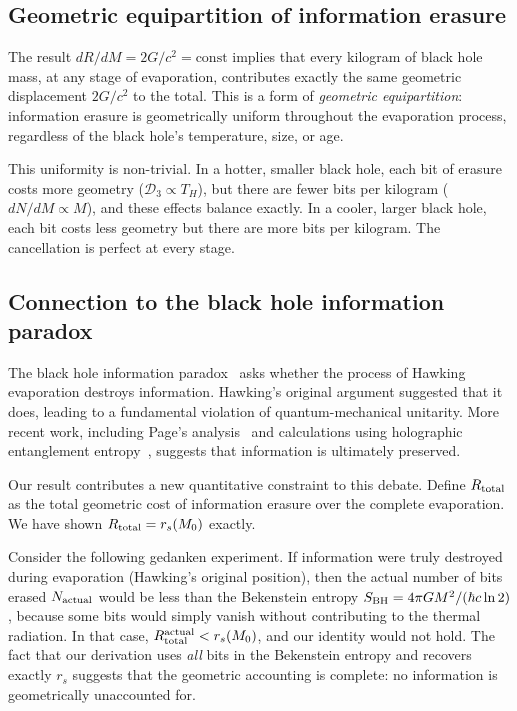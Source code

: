 \documentclass[aps,prd,twocolumn,showpacs,preprintnumbers,amsmath,amssymb,longbibliography]{revtex4-2}
\begin{document}
\subsection{Geometric equipartition of information erasure}

The result $dR/dM = 2G/c^2 = \text{const}$ implies that every kilogram of 
black hole mass, at any stage of evaporation, contributes exactly the same 
geometric displacement $2G/c^2$ to the total. This is a form of \textit{geometric 
equipartition}: information erasure is geometrically uniform throughout the 
evaporation process, regardless of the black hole's temperature, size, or age.

This uniformity is non-trivial. In a hotter, smaller black hole, each bit 
of erasure costs more geometry ($\mathcal{D}_3 \propto T_H$), but there are 
fewer bits per kilogram ($dN/dM \propto M$), and these effects balance exactly. 
In a cooler, larger black hole, each bit costs less geometry but there are more 
bits per kilogram. The cancellation is perfect at every stage.

\subsection{Connection to the black hole information paradox}

The black hole information paradox~\cite{hawking1976} asks whether the process 
of Hawking evaporation destroys information. Hawking's original argument suggested 
that it does, leading to a fundamental violation of quantum-mechanical unitarity. 
More recent work, including Page's analysis~\cite{page1993} and calculations 
using holographic entanglement entropy~\cite{penington2020,almheiri2019}, 
suggests that information is ultimately preserved.

Our result contributes a new quantitative constraint to this debate. Define 
$R_{\rm total}$ as the total geometric cost of information erasure over the 
complete evaporation. We have shown $R_{\rm total} = r_s(M_0)$ exactly. 

Consider the following gedanken experiment. If information were truly destroyed 
during evaporation (Hawking's original position), then the actual number of 
bits erased $N_{\rm actual}$ would be less than the Bekenstein entropy 
$S_{\rm BH} = 4\pi GM^2/(\hbar c \ln 2)$, because some bits would simply 
vanish without contributing to the thermal radiation. In that case, 
$R_{\rm total}^{\rm actual} < r_s(M_0)$, and our identity would not hold. 
The fact that our derivation uses \textit{all} bits in the Bekenstein entropy 
and recovers exactly $r_s$ suggests that the geometric accounting is complete: 
no information is geometrically unaccounted for.
\end{document}
